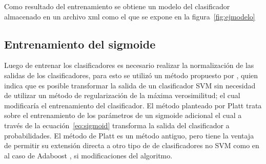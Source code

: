 Como resultado del entrenamiento se obtiene un modelo del clasificador almacenado en un archivo xml como el que se expone en la figura~\ref{fig:ejmodelo} 

\subsection{Entrenamiento del sigmoide}

Luego de entrenar los clasificadores es necesario realizar la normalización de las salidas de los clasificadores, para esto se utilizó un método propuesto por \cite{Platt1999}, quien indica que es posible transformar la salida de un clasificador SVM sin necesidad de utilizar un método de regularización de la máxima verosimilitud; el cual modificaría el entrenamiento del clasificador. El método planteado por Platt trata sobre el entrenamiento de los parámetros de un sigmoide adicional el cual a través de la ecuación~\ref{eq:sigmoid} transforma la salida del clasificador a probabilidades. El método de Platt es un método antiguo, pero tiene la ventaja de permitir su extensión directa a otro tipo de de clasificadores no SVM como en al caso de Adaboost \citep{Niculescu-mizil2005}, si modificaciones del algoritmo. 

